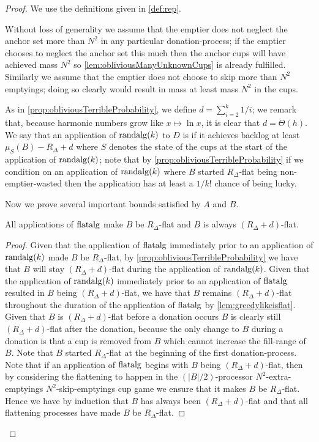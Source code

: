 \begin{proof}
  We use the definitions given in \cref{def:rep}.

Without loss of generality we assume that the emptier does not
neglect the anchor set more than $N^2$ in any particular donation-process;
if the emptier chooses to neglect the anchor set this
much then the anchor cups will have achieved mass $N^2$ so
\cref{lem:obliviousManyUnknownCups} is already fulfilled. 
Similarly we assume that the emptier does not choose to skip
more than $N^2$ emptyings; doing so clearly would result in mass
at least mass $N^2$ in the cups.

As in \cref{prop:obliviousTerribleProbability}, we define $d =
\sum_{i=2}^{k} 1/i$; we remark that, because harmonic numbers
grow like $x\mapsto \ln x$, it is clear that $d=\Theta(h)$. We say that an
application of $\operatorname{\text{\textup{randalg}}}(k)$ to $D$ is  if it
achieves backlog at least $\mu_S(B) - R_\Delta + d$ where $S$
denotes the state of the cups at the start of the application of
$\operatorname{\text{\textup{randalg}}}(k)$; note that by
\cref{prop:obliviousTerribleProbability} if we condition on an
application of $\operatorname{\text{\textup{randalg}}}(k)$ where $B$ started $R_\Delta$-flat
being non-emptier-wasted then the application has at least a
$1/k!$ chance of being lucky.

Now we prove several important bounds satisfied by $A$ and $B$.
\begin{clm}
  \label{clm:allflatteningsworkbyM}
  All applications of $\operatorname{\text{\textup{flatalg}}}$ make $B$ be $R_\Delta$-flat and
  $B$ is always $(R_\Delta + d)$-flat.
\end{clm}
\begin{proof}
  Given that the application of $\operatorname{\text{\textup{flatalg}}}$ immediately prior to an application
  of $\operatorname{\text{\textup{randalg}}}(k)$ made $B$ be $R_\Delta$-flat, by
  \cref{prop:obliviousTerribleProbability} we have that $B$ will
  stay $(R_\Delta + d)$-flat during the application of $\operatorname{\text{\textup{randalg}}}(k)$. 
  Given that the application of $\operatorname{\text{\textup{randalg}}}(k)$ immediately prior to an
  application of $\operatorname{\text{\textup{flatalg}}}$ resulted in $B$ being $(R_\Delta
  + d)$-flat, we have that $B$ remains $(R_\Delta + d)$-flat
  throughout the duration of the application of $\operatorname{\text{\textup{flatalg}}}$ by
  \cref{lem:greedylikeisflat}. Given that $B$ is $(R_\Delta +
  d)$-flat before a donation occurs $B$ is clearly still $(R_\Delta +
  d)$-flat after the donation, because the only change to $B$ during
  a donation is that a cup is removed from $B$ which cannot increase
  the fill-range of $B$.
  Note that $B$ started $R_\Delta$-flat at the beginning of the
  first donation-process.
  Note that if an application of $\operatorname{\text{\textup{flatalg}}}$ begins with $B$ being
  $(R_\Delta + d)$-flat, then by considering the flattening to
  happen in the $(|B|/2)$-processor $N^2$-extra-emptyings
  $N^2$-skip-emptyings cup game we ensure that it makes $B$ be
  $R_\Delta$-flat.
  Hence we have by induction that $B$ has always been $(R_\Delta
  + d)$-flat and that all flattening processes have made $B$ be
  $R_\Delta$-flat. 
\end{proof}


\end{proof}
